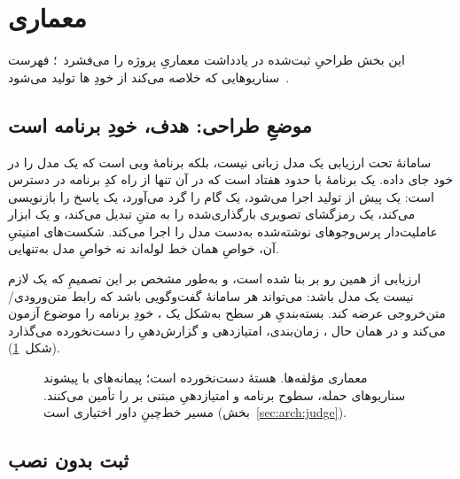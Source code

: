 \section{معماری}
\label{sec:architecture}

این بخش طراحیِ ثبت‌شده در یادداشت معماریِ پروژه را
می‌فشرد~\cite{pwnzzdocsarch}؛ فهرست سناریوهایی که خلاصه می‌کند از خودِ
ها تولید می‌شود~\cite{pwnzzdocsscen}.

\subsection{موضعِ طراحی: هدف، خودِ برنامه است}
\label{sec:arch:position}

سامانهٔ تحت ارزیابی یک مدل زبانی نیست، بلکه برنامهٔ وبی است که یک مدل را
در خود جای داده.  یک برنامهٔ  با حدود هفتاد
 است که در آن  تنها از راه کدِ برنامه در دسترس است: یک
 پیش از تولید اجرا می‌شود، یک گام 
 را گرد می‌آورد، یک  پاسخ را بازنویسی
می‌کند، یک رمزگشای  تصویری بارگذاری‌شده را به متنِ 
تبدیل می‌کند، و یک ابزار  عاملیت‌دار پرس‌وجوهای نوشته‌شده به‌دست
مدل را اجرا می‌کند. شکست‌های امنیتیِ آن، خواصِ همان خط لوله‌اند نه خواصِ
مدل به‌تنهایی.

ارزیابی از همین رو بر  بنا شده است، و به‌طور مشخص بر این تصمیمِ
 که یک \emph{} لازم نیست یک مدل باشد: می‌تواند هر
سامانهٔ گفت‌وگویی باشد که رابط متن‌ورودی/متن‌خروجی عرضه کند. بسته‌بندیِ هر
سطح  به‌شکل یک ، خودِ برنامه را موضوع آزمون می‌کند
و در همان حال ، زمان‌بندی، امتیازدهی و گزارش‌دهیِ 
را دست‌نخورده می‌گذارد (شکل~\ref{fig:architecture}).

\begin{figure}[!htbp]
  \centering
  \caption{معماری مؤلفه‌ها. هستهٔ  دست‌نخورده است؛ پیمانه‌های
   با پیشوند  سناریوهای حمله، سطوح برنامه و
  امتیازدهیِ مبتنی بر  را تأمین می‌کنند. مسیر خط‌چینِ
  داور اختیاری است (بخش~\ref{sec:arch:judge}).}
  \label{fig:architecture}
\end{figure}

\subsection{ثبت  بدون نصب}
\label{sec:arch:registration}

